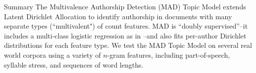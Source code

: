 \documentclass[final]{beamer}
\newlength{\onecolwid}
\newlength{\twocolwid}
\begin{document}
\begin{frame}[t]
\begin{columns}[t]
\begin{column}{\twocolwid}
\begin{alertblock}{Summary}
The Multivalence Authorship Detection (MAD) Topic Model extends Latent Dirichlet Allocation \citep{Blei2003} to identify authorship in documents with many separate types (``multivalent") of count features. MAD is ``doubly supervised''--it includes a multi-class logistic regression as in \cite{Blei2007}--and also fits per-author Dirichlet distributions for each feature type. We test the MAD Topic Model on several real world corpora using a variety of $n$-gram features, including part-of-speech, syllable stress, and sequences of word lengths.
\end{alertblock} 


\begin{columns}[t,totalwidth=\twocolwid] %

\begin{column}{\onecolwid} %



\end{column}
\end{columns}
\end{column}
\end{columns}
\end{frame}
\end{document}

